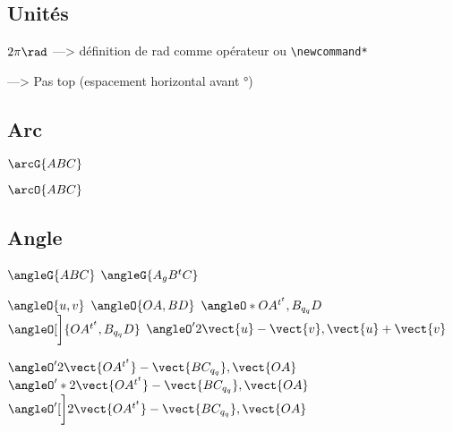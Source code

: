\documentclass{article}
\title{\packtested}
\author{moi}
\def\esphor{\hspace{1cm}}
\begin{document}
%
\maketitle{}
%
%
            \subsection{Unités}
%
%
$2\pi\rad$   ---> définition de rad comme opérateur ou \verb|\newcommand*|

  ---> Pas top (espacement horizontal avant °)
%
%
            \subsection{Arc}
%
%
$\arcG{ABC}$

$\arcO{ABC}$
%
%
            \subsection{Angle}
%
%
$\angleG{ABC}$
  \esphor  
$\angleG{A_gB^tC}$ 

$\angleO{u,v}$
  \esphor  
$\angleO{OA,BD}$
  \esphor  
$\angleO*{OA^{t^t},B_{q_q}D}$ 
  \esphor  
$\angleO[\bigg]{OA^{t^t},B_{q_q}D}$
  \esphor  
$\angleO'{2\vect{u}-\vect{v},\vect{u}+\vect{v}}$

\setiinotationformat{}
$\angleO'{2\vect{OA^{t^t}}-\vect{BC_{q_q}},\vect{OA}}$%
  \esphor  
$\angleO'*{2\vect{OA^{t^t}}-\vect{BC_{q_q}},\vect{OA}}$
  \esphor  
$\angleO'[\bigg]{2\vect{OA^{t^t}}-\vect{BC_{q_q}},\vect{OA}}$
%
\end{document}
